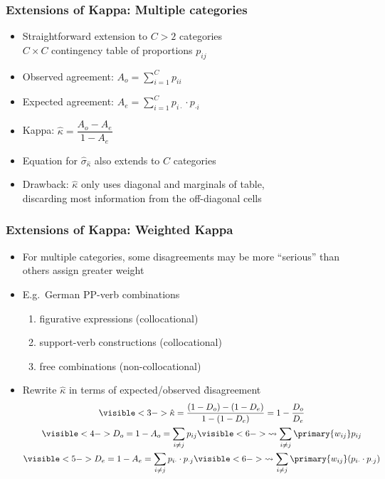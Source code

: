 \documentclass[t]{beamer} %
\begin{document}
\begin{frame}
  \frametitle{Extensions of Kappa: Multiple categories}
  
  \begin{itemize}
  \item Straightforward extension to $C > 2$ categories\\
    \so $C\times C$ contingency table of proportions $p_{ij}$
  \item<2-> Observed agreement: $A_o = \displaystyle\sum_{i=1}^C p_{ii}$
  \item<3-> Expected agreement: $A_e = \displaystyle\sum_{i=1}^C p_{i\cdot}\cdot
    p_{\cdot i}$
  \item<4-> Kappa: $\hat{\kappa} = \dfrac{A_o - A_e}{1 - A_e}$
  \item<4-> Equation for $\hat{\sigma}_{\hat{\kappa}}$ also extends to $C$ categories
  \item<5-> Drawback: $\hat{\kappa}$ only uses diagonal and marginals of table,\\
    discarding most information from the off-diagonal cells
  \end{itemize}
\end{frame}

\begin{frame}
  \frametitle{Extensions of Kappa: Weighted Kappa}
  
  \begin{itemize}
  \item For multiple categories, some disagreements may be more ``serious''
    than others \so assign greater weight
  \item E.g.\ German PP-verb combinations \citep{Krenn:Evert:Zinsmeister:04}
    \begin{enumerate}
    \item figurative expressions (collocational)
    \item support-verb constructions (collocational)
    \item free combinations (non-collocational)
    \end{enumerate}
  \item<2-> Rewrite $\hat{\kappa}$ in terms of expected/observed \h{disagreement}
    \begin{gather*}
      \visible<3->{
        \hat{\kappa} 
        = \frac{(1-D_o) - (1-D_e)}{1 - (1 - D_e)}
        = 1 - \frac{D_o}{D_e}
      }
    \\
    \visible<4->{
      D_o = 1 - A_o = \sum_{i\neq j} p_{ij} 
      \visible<6->{\leadsto \sum_{i\neq j} \primary{w_{ij}} p_{ij}} 
    }
    \\
    \visible<5->{
      D_e = 1 - A_e = \sum_{i\neq j} p_{i\cdot}\cdot p_{\cdot j} 
      \visible<6->{\leadsto \sum_{i\neq j} \primary{w_{ij}} (p_{i\cdot}\cdot p_{\cdot j})}
    }
  \end{gather*}
\end{itemize}
\end{frame}
\end{document}
